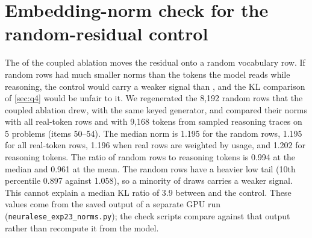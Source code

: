 \section{Embedding-norm check for the random-residual control}\label{app:norms}

The \ctrl{} of the coupled ablation moves the residual onto a random vocabulary row.
If random rows had much smaller norms than the tokens the model reads while reasoning, the control would carry a weaker
signal than \ST{}, and the KL comparison of \cref{sec:q4} would be unfair to it.
We regenerated the 8,192 random rows that the coupled ablation drew, with the same keyed generator, %
and compared their norms with all real-token rows and with 9,168 tokens from sampled reasoning traces on 5 problems %
(items 50--54). %
The median norm is 1.195 for the random rows, 1.195 for all real-token rows, 1.196 when real rows are weighted %
by usage, and 1.202 for reasoning tokens. %
The ratio of random rows to reasoning tokens is 0.994 at the median and 0.961 at the mean. %
The random rows have a heavier low tail (10th percentile 0.897 against 1.058), so a minority of draws carries a %
weaker signal.
This cannot explain a median KL ratio of 3.9 between \ST{} and the control. %
These values come from the saved output of a separate GPU run (\texttt{neuralese\_exp23\_norms.py}); the check
scripts compare against that output rather than recompute it from the model.
